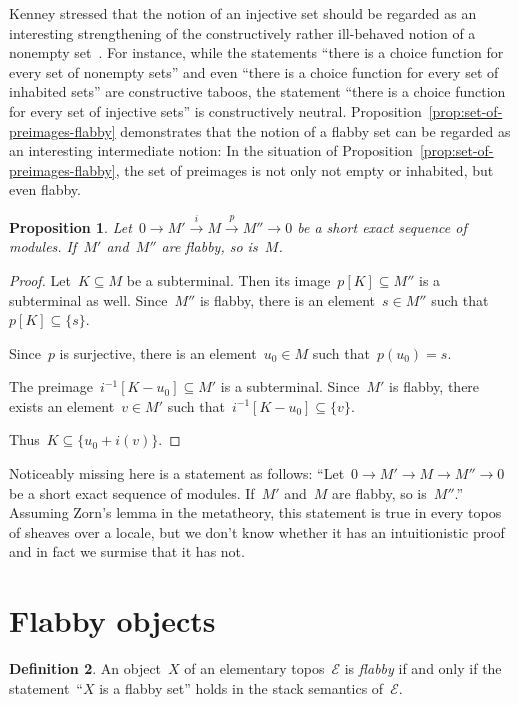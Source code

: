 \documentclass[oneside]{amsart}
\theoremstyle{definition}
\newtheorem{defn}{Definition}[section]
\theoremstyle{plain}
\newtheorem{prop}[defn]{Proposition}
\theoremstyle{remark}
\newcommand{\xra}[1]{\xrightarrow{#1}}
\newcommand{\E}{\mathcal{E}}
\renewcommand{\_}{\mathpunct{.}\,}
\begin{document}
Kenney stressed that the notion of an injective set should be regarded as an
interesting strengthening of the constructively rather ill-behaved notion of a
nonempty set~\cite{kenney:injective-choice}. For instance, while the statements
``there is a choice function for every set of nonempty sets'' and even ``there
is a choice function for every set of inhabited sets'' are constructive taboos,
the statement ``there is a choice function for every set of injective sets'' is
constructively neutral. Proposition~\ref{prop:set-of-preimages-flabby} demonstrates
that the notion of a flabby set can be regarded as an interesting intermediate
notion: In the situation of Proposition~\ref{prop:set-of-preimages-flabby}, the
set of preimages is not only not empty or inhabited, but even flabby.

\begin{prop}Let~$0 \to M' \xra{i} M \xra{p} M'' \to 0$ be a short exact
sequence of modules. If~$M'$ and~$M''$ are flabby, so is~$M$.
\end{prop}

\begin{proof}Let~$K \subseteq M$ be a subterminal. Then its image~$p[K] \subseteq M''$
is a subterminal as well. Since~$M''$ is flabby, there is an element~$s \in
M''$ such that~$p[K] \subseteq \{ s \}$.

Since~$p$ is surjective, there is an element~$u_0 \in M$ such that~$p(u_0) =
s$.

The preimage~$i^{-1}[K - u_0] \subseteq M'$ is a subterminal. Since~$M'$ is
flabby, there exists an element~$v \in M'$ such that~$i^{-1}[K - u_0] \subseteq
\{v\}$.

Thus~$K \subseteq \{ u_0 + i(v) \}$.
\end{proof}

Noticeably missing here is a statement as follows: ``Let~$0 \to M' \to M \to
M'' \to 0$ be a short exact sequence of modules. If~$M'$ and~$M$ are flabby, so
is~$M''$.'' Assuming Zorn's lemma in the metatheory, this statement is true in
every topos of sheaves over a locale, but we don't know whether it has an
intuitionistic proof and in fact we surmise that it has not.


\section{Flabby objects}

\begin{defn}An object~$X$ of an elementary topos~$\E$ is \emph{flabby} if and
only if the statement~``$X$ is a flabby set'' holds in the stack semantics
of~$\E$.\end{defn}
\end{document}
